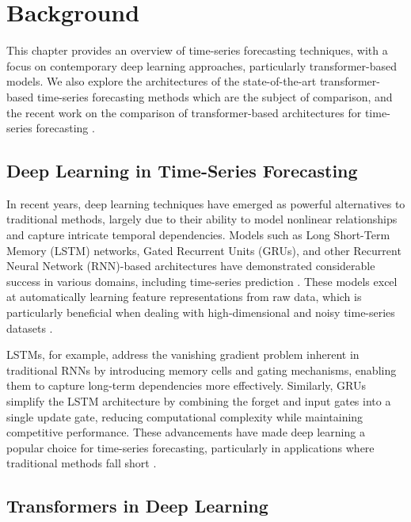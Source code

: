 \chapter{Background}\label{ch02:litreview}

This chapter provides an overview of time-series forecasting techniques, with a focus on contemporary deep learning approaches, particularly transformer-based models. We also explore the architectures of the state-of-the-art transformer-based time-series forecasting methods which are the subject of comparison, and the recent work on the comparison of transformer-based architectures for time-series forecasting \cite{Wawale2022ANOM, Mendis2024MultivariateTS}.

\section{Deep Learning in Time-Series Forecasting}\label{sec:tsforecasting}

In recent years, deep learning techniques have emerged as powerful alternatives to traditional methods, largely due to their ability to model nonlinear relationships and capture intricate temporal dependencies. Models such as Long Short-Term Memory (LSTM) networks, Gated Recurrent Units (GRUs), and other Recurrent Neural Network (RNN)-based architectures have demonstrated considerable success in various domains, including time-series prediction \cite{Wang2024AdvancementsID, Kumar2024ASO}. These models excel at automatically learning feature representations from raw data, which is particularly beneficial when dealing with high-dimensional and noisy time-series datasets \cite{Abbas2024DeepLT}. 

LSTMs, for example, address the vanishing gradient problem inherent in traditional RNNs by introducing memory cells and gating mechanisms, enabling them to capture long-term dependencies more effectively. Similarly, GRUs simplify the LSTM architecture by combining the forget and input gates into a single update gate, reducing computational complexity while maintaining competitive performance. These advancements have made deep learning a popular choice for time-series forecasting, particularly in applications where traditional methods fall short \cite{Hochreiter1997LongSM}.

\section{Transformers in Deep Learning}\label{sec:transformers}

